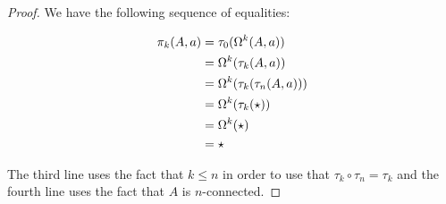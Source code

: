 \begin{proof}
  We have the following sequence of equalities:

  \begin{align*}
    \pi_k(A,a) &= \tau_0(\Omega^k(A,a)) \\
    &= \Omega^k(\tau_k(A,a)) \\
    &= \Omega^k(\tau_k(\tau_n(A,a))) \\
    &= \Omega^k(\tau_k(\star)) \\
    &= \Omega^k(\star) \\
    &= \star
  \end{align*}

  The third line uses the fact that $k\le{}n$ in order to use that
  $\tau_k\circ\tau_n=\tau_k$ and the fourth line uses the fact that $A$ is
  $n$-connected.
\end{proof}

